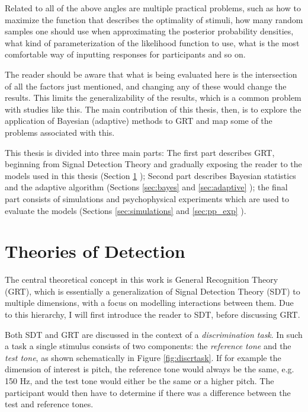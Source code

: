 \documentclass{article}\usepackage{knitr}
\begin{document}
Related to all of the above angles are multiple practical problems, such as how to maximize the function that describes the optimality of stimuli, how many random samples one should use when approximating the posterior probability densities, what kind of parameterization of the likelihood function to use, what is the most comfortable way of inputting responses for participants and so on. 

The reader should be aware that what is being evaluated here is the intersection of all the factors just mentioned, and changing any of these would change the results. This limits the generalizability of the results, which is a common problem with studies like this. The main contribution of this thesis, then, is to explore the application of Bayesian (adaptive) methods to GRT and map some of the problems associated with this.

This thesis is divided into three main parts: The first part describes GRT, beginning from Signal Detection Theory and gradually exposing the reader to the models used in this thesis (Section \ref{sec:GRT} \textit{}); Second part describes Bayesian statistics and the adaptive algorithm (Sections \ref{sec:bayes} \textit{} and \ref{sec:adaptive} \textit{}); the final part consists of simulations and psychophysical experiments which are used to evaluate the models (Sections \ref{sec:simulations} \textit{} and \ref{sec:pp_exp} \textit{}).

\newpage


\section{Theories of Detection}
\label{sec:GRT}

The central theoretical concept in this work is General Recognition Theory (GRT), which is essentially a generalization of Signal Detection Theory (SDT) to multiple dimensions, with a focus on modelling interactions between them. Due to this hierarchy, I will first introduce the reader to SDT, before discussing GRT.

Both SDT and GRT are discussed in the context of a \textit{discrimination task}. In such a task a single stimulus consists of two components: the \textit{reference tone} and the \textit{test tone}, as shown schematically  in Figure \ref{fig:discrtask}. If for example the dimension of interest is pitch, the reference tone would always be the same, e.g. 150 Hz, and the test tone would either be the same or a higher pitch. The participant would then have to determine if there was a difference between the test and reference tones.
\end{document}
